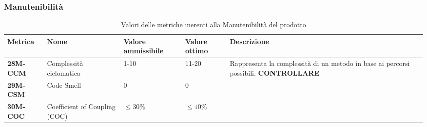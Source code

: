 \subsubsection{Manutenibilità}
\begin{table}[h!]
	\centering
	\begin{tabularx}{\textwidth}{|X|X|X|X|X|} 	 
		\hline
		\textbf{Metrica} 	& \textbf{Nome} & \textbf{Valore ammissibile} & \textbf{Valore ottimo} & \textbf{Descrizione}\\  	 
		\hline
		\textbf{28M-CCM} & Complessità ciclomatica & 1-10 & 11-20 & Rappresenta la complessità di un metodo in base ai percorsi possibili. \textbf{CONTROLLARE}\\
		\hline
		\textbf{29M-CSM} & Code Smell & 0 & 0 & \\ 
		\hline
		\textbf{30M-COC} & Coefficient of Coupling (COC) & $\leq 30\% $ & $\leq 10\% $ & \\ 
		\hline
	\end{tabularx}
	\caption{ Valori delle metriche inerenti alla Manutenibilità del prodotto}
	\label{table:11}
\end{table}